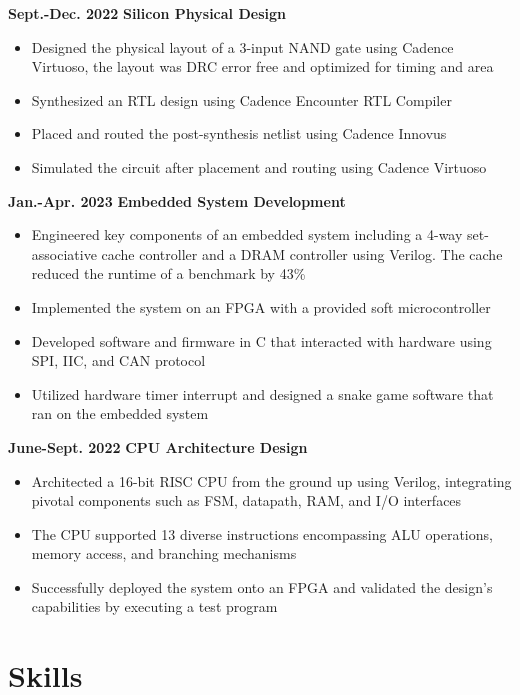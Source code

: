 \documentclass[11pt,a4paper,sans]{moderncv}
\begin{document}
\cventry
{\textnormal{\textbf{Sept.-Dec. 2022}}}
{\textnormal{\textbf{Silicon Physical Design}}}
{}{}{}
{
    \begin{itemize}
    \item Designed the physical layout of a 3-input NAND gate using Cadence Virtuoso, the layout was DRC error free and optimized for timing and area
    \item Synthesized an RTL design using Cadence Encounter RTL Compiler
    \item Placed and routed the post-synthesis netlist using Cadence Innovus
    \item Simulated the circuit after placement and routing using Cadence Virtuoso 
    \end{itemize}
}

\cventry
{\textnormal{\textbf{Jan.-Apr. 2023}}}
{\textnormal{\textbf{Embedded System Development}}}
{}{}{}
{
    \begin{itemize}
    \item Engineered key components of an embedded system including a 4-way set-associative cache controller and a DRAM controller using Verilog. The cache reduced the runtime of a benchmark by 43\%
    \item Implemented the system on an FPGA with a provided soft microcontroller 
    \item Developed software and firmware in C that interacted with hardware using SPI, IIC, and CAN protocol 
    \item Utilized hardware timer interrupt and designed a snake game software that ran on the embedded system
    \end{itemize}
}

\cventry
{\textnormal{\textbf{June-Sept. 2022}}}
{\textnormal{\textbf{CPU Architecture Design}}}
{}{}{}
{
    \begin{itemize}
    \item Architected a 16-bit RISC CPU from the ground up using Verilog, integrating pivotal components such as FSM, datapath, RAM, and I/O interfaces
    \item The CPU supported 13 diverse instructions encompassing ALU operations, memory access, and branching mechanisms
    \item Successfully deployed the system onto an FPGA and validated the design's capabilities by executing a test program
\end{itemize}
}

\section{Skills}

\end{document}
